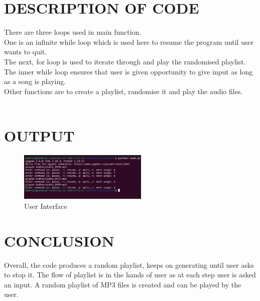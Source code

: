 \documentclass[journal,12pt,twocolumn]{IEEEtran}
\begin{document}
\section{DESCRIPTION OF CODE } There are three loops used in main function.\\
One is an infinite while loop which is used here to resume the program until user wants to quit.\\
The next, for loop is used to iterate through and play the randomised playlist.\\
The inner while loop ensures that user is given opportunity to give input as long as a song is playing.\\
Other functions are to create a playlist, randomise it and play the audio files.
\\
\\
\section{OUTPUT} 
\begin{figure}[h]
  \centering
  \includegraphics[bb=0 0 716 268,width=0.55\textwidth]{output.png}
  \captionsetup{justification=centering}
  \caption{User Interface}
\end{figure}
\section{CONCLUSION } Overall, the code produces a random playlist, keeps on generating until user asks to stop it. The flow of playlist is in the hands of user as at each step user is asked an input. A random playlist of MP3 files is created
and can be played by the user.
\end{document}
